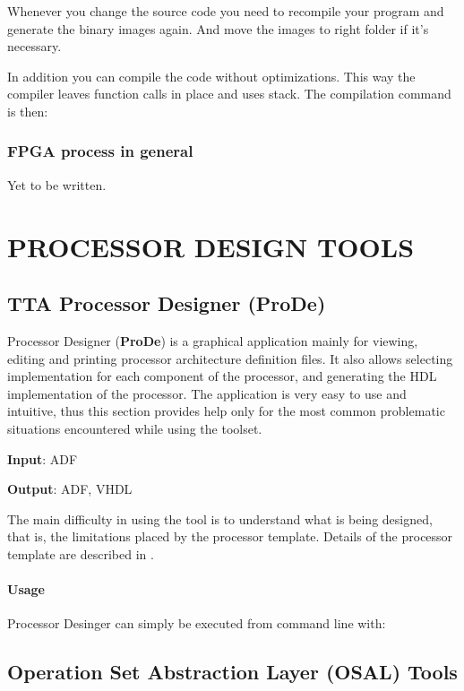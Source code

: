 \documentclass[twoside]{tceusermanual}
\begin{document}
Whenever you change the source code you need to recompile your program and
generate the binary images again. And move the images to right folder if it's
necessary.

In addition you can compile the code without optimizations. This way the
compiler leaves function calls in place and uses stack. The compilation
command is then:



\subsection{FPGA process in general}
Yet to be written.

\chapter{PROCESSOR DESIGN TOOLS}
\label{chapter:procgen}

\section{TTA Processor Designer (ProDe)}
\label{sec:prode}

Processor Designer (\textbf{ProDe}) is a graphical application mainly for
viewing, editing and printing processor architecture definition files. 
It also allows selecting implementation for each component of the processor,
and generating the HDL implementation of the processor. The application is
very easy to use and intuitive, thus this section provides help only for the
most common problematic situations encountered while using the toolset.

\textbf{Input}: ADF

\textbf{Output}: ADF, VHDL

The main difficulty in using the tool is to understand what is being
designed, that is, the limitations placed by the processor template. 
Details of the processor template are described in \cite{ADF-specs}.

\subsubsection{Usage}

Processor Desinger can simply be executed from command line with:



\section{Operation Set Abstraction Layer (OSAL) Tools}
\label{sec:osalTools}
\end{document}
